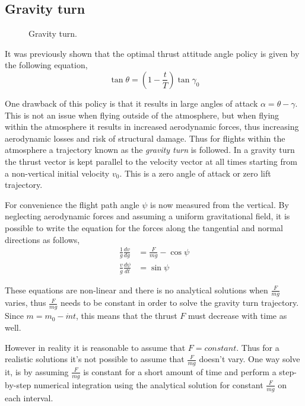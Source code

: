 \newpage
\subsection{Gravity turn}
\begin{figure} 		
	\centering
				
	\caption{Gravity turn\cite{thomson2012introduction}.}
	\label{fig:grav_turn}
\end{figure}

It was previously shown that the optimal thrust attitude angle policy is given by the following equation,
\begin{equation}
    \tan {\theta} = \left(1-\frac{t}{T}\right)\tan{\gamma_0}
\end{equation}

One drawback of this policy is that it results in large angles of attack $\alpha = \theta - \gamma$. This is not an issue when flying outside of the atmosphere, but when flying within the atmosphere it results in increased aerodynamic forces, thus increasing aerodynamic losses and risk of structural damage. Thus for flights within the atmosphere a trajectory known as the \emph{gravity turn} is followed. In a gravity turn the thrust vector is kept parallel to the velocity vector at all times starting from a non-vertical initial velocity $v_0$. This is a zero angle of attack or zero lift trajectory.

For convenience the flight path angle $\psi$ is now measured from the vertical. By neglecting aerodynamic forces and assuming a uniform gravitational field, it is possible to write the equation for the forces along the tangential and normal directions as follows,
\begin{align}
    \frac{1}{g} \frac{dv}{dg} &= \frac{F}{mg} - \cos{\psi} \label{eq:gturnzf_1}\\
    \frac{v}{g} \frac{d \psi}{dt} &= \sin{\psi} \label{eq:gturnzf_2}
\end{align}

These equations are non-linear and there is no analytical solutions when $\frac{F}{mg}$ varies, thus $\frac{F}{mg}$ needs to be constant in order to solve the gravity turn trajectory. Since $m = m_0 - \dot{m}t$, this means that the thrust $F$ must decrease with time as well.

However in reality it is reasonable to assume that $F=constant$. Thus for a realistic solutions it's not possible to assume that $\frac{F}{mg}$ doesn't vary. One way solve it, is by assuming $\frac{F}{mg}$ is constant for a short amount of time and perform a step-by-step numerical integration using the analytical solution for constant $\frac{F}{mg}$ on each interval.


